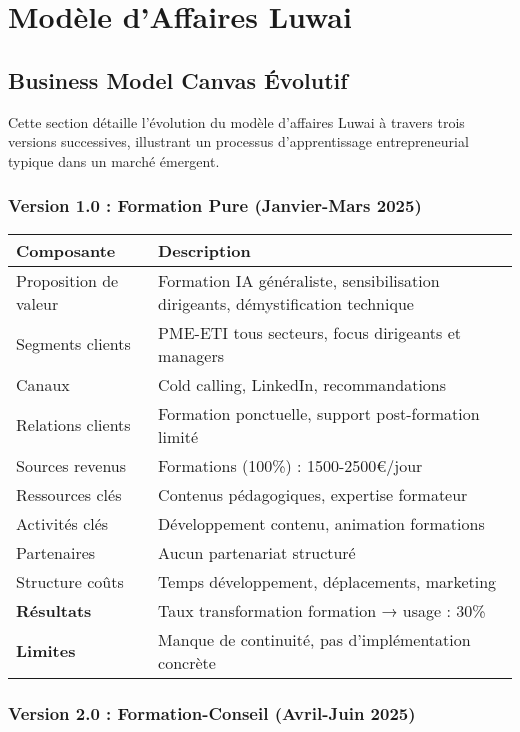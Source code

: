 \chapter{Modèle d'Affaires Luwai}
\label{app:luwai}

\section{Business Model Canvas Évolutif}

Cette section détaille l'évolution du modèle d'affaires Luwai à travers trois versions successives, illustrant un processus d'apprentissage entrepreneurial typique dans un marché émergent.

\subsection{Version 1.0 : Formation Pure (Janvier-Mars 2025)}

\begin{longtable}{@{}>{\raggedright\arraybackslash}p{4cm}>{\raggedright\arraybackslash}p{10cm}@{}}
\toprule
\textbf{Composante} & \textbf{Description} \\
\midrule
Proposition de valeur & Formation IA généraliste, sensibilisation dirigeants, démystification technique \\
Segments clients & PME-ETI tous secteurs, focus dirigeants et managers \\
Canaux & Cold calling, LinkedIn, recommandations \\
Relations clients & Formation ponctuelle, support post-formation limité \\
Sources revenus & Formations (100\%) : 1500-2500€/jour \\
Ressources clés & Contenus pédagogiques, expertise formateur \\
Activités clés & Développement contenu, animation formations \\
Partenaires & Aucun partenariat structuré \\
Structure coûts & Temps développement, déplacements, marketing \\
\midrule
\textbf{Résultats} & Taux transformation formation → usage : 30\% \\
\textbf{Limites} & Manque de continuité, pas d'implémentation concrète \\
\bottomrule
\end{longtable}

\subsection{Version 2.0 : Formation-Conseil (Avril-Juin 2025)}

